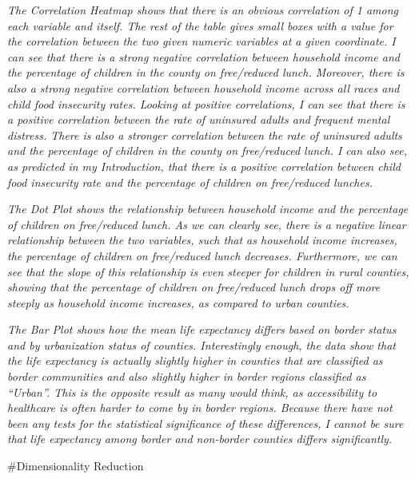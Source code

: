 \documentclass[]{article}
\begin{document}
\emph{The Correlation Heatmap shows that there is an obvious correlation
of 1 among each variable and itself. The rest of the table gives small
boxes with a value for the correlation between the two given numeric
variables at a given coordinate. I can see that there is a strong
negative correlation between household income and the percentage of
children in the county on free/reduced lunch. Moreover, there is also a
strong negative correlation between household income across all races
and child food insecurity rates. Looking at positive correlations, I can
see that there is a positive correlation between the rate of uninsured
adults and frequent mental distress. There is also a stronger
correlation between the rate of uninsured adults and the percentage of
children in the county on free/reduced lunch. I can also see, as
predicted in my Introduction, that there is a positive correlation
between child food insecurity rate and the percentage of children on
free/reduced lunches.}

\emph{The Dot Plot shows the relationship between household income and
the percentage of children on free/reduced lunch. As we can clearly see,
there is a negative linear relationship between the two variables, such
that as household income increases, the percentage of children on
free/reduced lunch decreases. Furthermore, we can see that the slope of
this relationship is even steeper for children in rural counties,
showing that the percentage of children on free/reduced lunch drops off
more steeply as household income increases, as compared to urban
counties.}

\emph{The Bar Plot shows how the mean life expectancy differs based on
border status and by urbanization status of counties. Interestingly
enough, the data show that the life expectancy is actually slightly
higher in counties that are classified as border communities and also
slightly higher in border regions classified as ``Urban''. This is the
opposite result as many would think, as accessibility to healthcare is
often harder to come by in border regions. Because there have not been
any tests for the statistical significance of these differences, I
cannot be sure that life expectancy among border and non-border counties
differs significantly.}

\#Dimensionality Reduction
\end{document}
